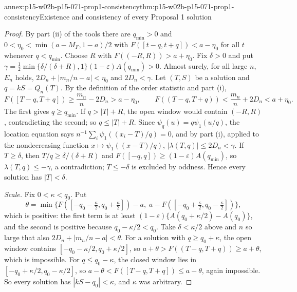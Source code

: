 \begin{annexitem}{annex:p15-w02b-p15-071-prop1-consistency}{thm:p15-w02b-p15-071-prop1-consistency}{Existence and consistency of every Proposal 1 solution}
\begin{proof}
By part (ii) of the tools there are \(q_{\min}>0\) and
\(0<\eta_0<\min(a-M_F,1-a)/2\) with \(F([t-q,t+q])<a-\eta_0\) for all
\(t\) whenever \(q<q_{\min}\). Choose \(R\) with
\(F((-R,R))>a+\eta_0\). Fix \(\delta>0\) and put
\(\gamma=\tfrac12\min\{\delta/(\delta+R),1\}(1-\varepsilon)A(q_{\min})>0\).
Almost surely, for all large \(n\), \(E_n\) holds,
\(2D_n+|m_n/n-a|<\eta_0\) and \(2D_n<\gamma\).
Let \((T,S)\) be a solution and \(q=kS=Q_n(T)\). By the definition of
the order statistic and part (i),
\[
 F([T-q,T+q])\geq\frac{m_n}n-2D_n>a-\eta_0,\qquad
 F((T-q,T+q))<\frac{m_n}n+2D_n<a+\eta_0 .
\]
The first gives \(q\geq q_{\min}\). If \(q>|T|+R\), the open window
would contain \((-R,R)\), contradicting the second; so
\(q\leq|T|+R\). Since \(\psi_q(u)=q\psi_1(u/q)\), the location equation
says \(n^{-1}\sum_i\psi_1((x_i-T)/q)=0\), and by part (i), applied to
the nondecreasing function \(x\mapsto\psi_1((x-T)/q)\),
\(|\lambda(T,q)|\leq2D_n<\gamma\). If \(T\geq\delta\), then
\(T/q\geq\delta/(\delta+R)\) and
\(F([-q,q])\geq(1-\varepsilon)A(q_{\min})\), so
\(\lambda(T,q)\leq-\gamma\), a contradiction; \(T\leq-\delta\) is
excluded by oddness. Hence every solution has \(|T|<\delta\).

\emph{Scale.} Fix \(0<\kappa<q_0\). Put
\[
 \theta=\min\bigl\{F([-q_0-\tfrac\kappa2,q_0+\tfrac\kappa2])-a,\;
 a-F([-q_0+\tfrac\kappa2,q_0-\tfrac\kappa2])\bigr\},
\]
which is positive: the first term is at least
\((1-\varepsilon)\{A(q_0+\kappa/2)-A(q_0)\}\), and the second is
positive because \(q_0-\kappa/2<q_0\). Take \(\delta<\kappa/2\) above
and \(n\) so large that also \(2D_n+|m_n/n-a|<\theta\). For a solution
with \(q\geq q_0+\kappa\), the open window contains
\([-q_0-\kappa/2,q_0+\kappa/2]\), so
\(a+\theta>F((T-q,T+q))\geq a+\theta\), which is impossible. For
\(q\leq q_0-\kappa\), the closed window lies in
\([-q_0+\kappa/2,q_0-\kappa/2]\), so
\(a-\theta<F([T-q,T+q])\leq a-\theta\), again impossible. So every
solution has \(|kS-q_0|<\kappa\), and \(\kappa\) was arbitrary.
\end{proof}
\end{annexitem}


